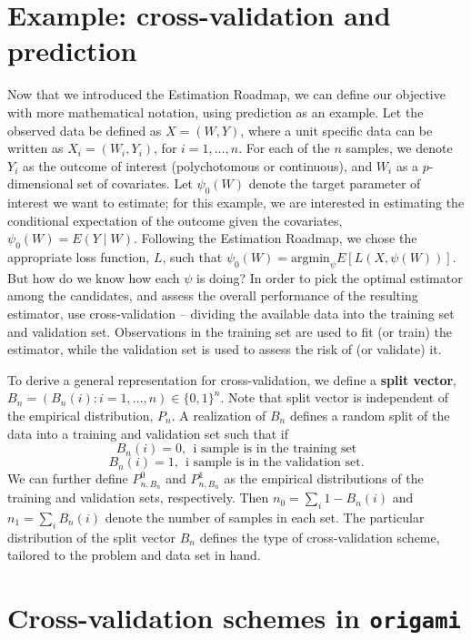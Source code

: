 \documentclass[12pt, krantz2,]{book}
\theoremstyle{definition}
\theoremstyle{definition}
\theoremstyle{definition}
\newcommand{\1}{\mathbbm{1}}
\begin{document}
\hypertarget{example-cross-validation-and-prediction}{%
\section{Example: cross-validation and prediction}\label{example-cross-validation-and-prediction}}

Now that we introduced the Estimation Roadmap, we can define our objective with
more mathematical notation, using prediction as an example. Let the observed
data be defined as \(X = (W,Y)\), where a unit specific data can be written as
\(X_i = (W_i,Y_i)\), for \(i = 1, \ldots, n\). For each of the \(n\) samples, we
denote \(Y_i\) as the outcome of interest (polychotomous or continuous), and \(W_i\)
as a \(p\)-dimensional set of covariates. Let \(\psi_0(W)\) denote the target
parameter of interest we want to estimate; for this example, we are interested
in estimating the conditional expectation of the outcome given the covariates,
\(\psi_0(W) = E(Y \mid W)\). Following the Estimation Roadmap, we chose the
appropriate loss function, \(L\), such that \(\psi_0(W) = \text{argmin}_{\psi} E[L(X,\psi(W))]\). But how do we know how each \(\psi\) is doing? In order to pick
the optimal estimator among the candidates, and assess the overall performance
of the resulting estimator, use cross-validation -- dividing the available data
into the training set and validation set. Observations in the training set are
used to fit (or train) the estimator, while the validation set is used to assess
the risk of (or validate) it.

To derive a general representation for cross-validation, we define a \textbf{split
vector}, \(B_n = (B_n(i): i = 1, \ldots, n) \in \{0,1\}^n\). Note that split
vector is independent of the empirical distribution, \(P_n\). A realization of
\(B_n\) defines a random split of the data into a training and validation set such
that if
\[B_n(i) = 0, \ \ \text{i sample is in the training set}\]
\[B_n(i) = 1, \ \ \text{i sample is in the validation set.}\]
We can further define \(P_{n,B_n}^0\) and \(P_{n,B_n}^1\) as the empirical
distributions of the training and validation sets, respectively. Then \(n_0 = \sum_i 1-B_n(i)\) and \(n_1 = \sum_i B_n(i)\) denote the number of samples in each
set. The particular distribution of the split vector \(B_n\) defines the type of
cross-validation scheme, tailored to the problem and data set in hand.

\hypertarget{cross-validation-schemes-in-origami}{%
\section{\texorpdfstring{Cross-validation schemes in \texttt{origami}}{Cross-validation schemes in origami}}\label{cross-validation-schemes-in-origami}}
\end{document}
